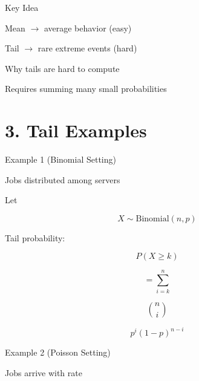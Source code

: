 \documentclass[12pt]{article}
\begin{document}
Key Idea

\vspace{0.5em}

Mean $\rightarrow$ average behavior (easy)

Tail $\rightarrow$ rare extreme events (hard)

\vspace{1em}

Why tails are hard to compute

Requires summing many small probabilities

\vspace{2em}

\section*{3. Tail Examples}

\vspace{0.5em}

Example 1 (Binomial Setting)

\vspace{0.5em}

Jobs distributed among servers

\vspace{0.5em}

Let

\vspace{0.5em}

\[
X \sim \text{Binomial}(n, p)
\]

\vspace{1em}

Tail probability:

\vspace{0.5em}

\[
P(X \geq k)
\]

\vspace{0.5em}

\[
= \sum_{i=k}^{n}
\]

\vspace{0.5em}

\[
\binom{n}{i}
\]

\vspace{0.5em}

\[
p^i (1-p)^{n-i}
\]

\vspace{2em}

Example 2 (Poisson Setting)

\vspace{0.5em}

Jobs arrive with rate
\end{document}
